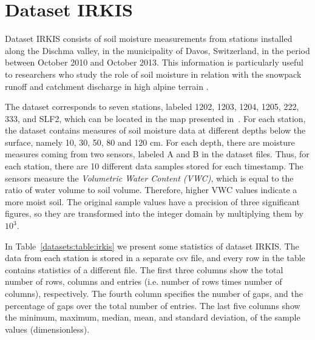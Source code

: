 
\clearpage
\section{Dataset IRKIS}
\label{datasets:irkis}


Dataset IRKIS \cite{dataset:irkis} consists of soil moisture measurements from stations installed along the Dischma valley, in the municipality of Davos, Switzerland, in the period between October 2010 and October 2013. This information is particularly useful to researchers who study the role of soil moisture in relation with the snowpack runoff and catchment discharge in high alpine terrain \cite{dataset:irkis2}. 


The dataset corresponds to seven stations, labeled 1202, 1203, 1204, 1205, 222, 333, and SLF2, which can be located in the map presented in~\cite{dataset:irkis}. For each station, the dataset contains measures of soil moisture data at different depths below the surface, namely 10, 30, 50, 80 and 120 cm. For each depth, there are moisture measures coming from two sensors, labeled A and B in the dataset files. Thus, for each station, there are 10 different data samples stored for each timestamp. The sensors measure the \textit{Volumetric Water Content (VWC)}, which is equal to the ratio of water volume to soil volume. Therefore, higher VWC values indicate a more moist soil. The original sample values have a precision of three significant figures, so they are transformed into the integer domain by multiplying them by $10^3$. 


\newcommand{\commonTable}{The first three columns show the total number of rows, columns and entries (i.e. number of rows times number of columns), respectively. The fourth column specifies the number of gaps, and the percentage of gaps over the total number of entries. The last five columns show the minimum, maximum, median, mean, and standard deviation, of the sample values }


In Table~\ref{datasets:table:irkis} we present some statistics of dataset IRKIS. The data from each station is stored in a separate csv file, and every row in the table contains statistics of a different file. \commonTable (dimensionless).




